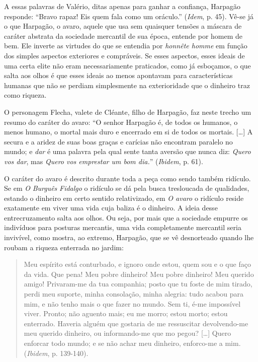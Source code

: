 A essas palavras de Valério, ditas apenas para ganhar a confiança,
Harpagão responde: ``Bravo rapaz! Eis quem fala como um oráculo.''
(\emph{Idem}, p. 45). Vê-se já o que Harpagão, o avaro, aquele que usa
sem quaisquer tensões a máscara de caráter abstrata da sociedade
mercantil de sua época, entende por homem de bem. Ele inverte as
virtudes do que se entendia por \emph{honnête homme} em função dos
simples aspectos exteriores e compráveis. Se esses aspectos, esses
ideais de uma certa elite não eram necessariamente praticados, como já
esboçamos, o que salta aos olhos é que esses ideais ao menos apontavam
para características humanas que não se perdiam simplesmente na
exterioridade que o dinheiro traz como riqueza.

O personagem Flecha, valete de Cléante, filho de Harpagão, faz neste
trecho um resumo do caráter do avaro: ``O senhor Harpagão é, de todos os
humanos, o menos humano, o mortal mais duro e encerrado em si de todos
os mortais. {[}\ldots{}{]} A secura e a aridez de suas boas graças e
carícias não encontram paralelo no mundo; e \emph{dar} é uma palavra
pela qual sente tanta aversão que nunca diz: \emph{Quero vos dar}, mas
\emph{Quero vos emprestar um bom dia.}'' (\emph{Ibidem}, p. 61).

O caráter do avaro é descrito durante toda a peça como sendo também
ridículo. Se em \emph{O} \emph{Burguês} \emph{Fidalgo} o ridículo se dá
pela busca tresloucada de qualidades, estando o dinheiro em certo
sentido relativizado, em \emph{O avaro} o ridículo reside exatamente em
viver uma vida cuja baliza é o dinheiro. A ideia desse entrecruzamento
salta aos olhos. Ou seja, por mais que a sociedade empurre os indivíduos
para posturas mercantis, uma vida completamente mercantil seria
invivível, como mostra, ao extremo, Harpagão, que se vê desnorteado
quando lhe roubam a riqueza enterrada no jardim:

\begin{quote}
Meu espírito está conturbado, e ignoro onde estou, quem sou e o que faço
da vida. Que pena! Meu pobre dinheiro! Meu pobre dinheiro! Meu querido
amigo! Privaram-me da tua companhia; posto que tu foste de mim tirado,
perdi meu suporte, minha consolação, minha alegria: tudo acabou para
mim, e não tenho mais o que fazer no mundo. Sem ti, é-me impossível
viver. Pronto; não aguento mais; eu me morro; estou morto; estou
enterrado. Haveria alguém que gostaria de me ressuscitar devolvendo-me
meu querido dinheiro, ou informando-me que mo pegou? {[}\ldots{}{]}
Quero enforcar todo mundo; e se não achar meu dinheiro, enforco-me a
mim. (\emph{Ibidem}, p. 139-140).
\end{quote}

